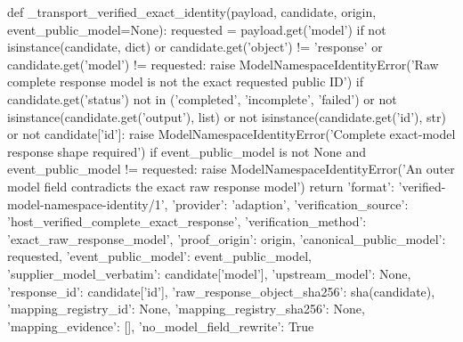 {def _transport_verified_exact_identity(payload, candidate, origin, event_public_model=None):
    requested = payload.get('model')
    if not isinstance(candidate, dict) or candidate.get('object') != 'response' or candidate.get('model') != requested:
        raise ModelNamespaceIdentityError('Raw complete response model is not the exact requested public ID')
    if candidate.get('status') not in ('completed', 'incomplete', 'failed') or not isinstance(candidate.get('output'), list) or not isinstance(candidate.get('id'), str) or not candidate['id']:
        raise ModelNamespaceIdentityError('Complete exact-model response shape required')
    if event_public_model is not None and event_public_model != requested:
        raise ModelNamespaceIdentityError('An outer model field contradicts the exact raw response model')
    return {'format': 'verified-model-namespace-identity/1', 'provider': 'adaption',
        'verification_source': 'host_verified_complete_exact_response',
        'verification_method': 'exact_raw_response_model', 'proof_origin': origin,
        'canonical_public_model': requested, 'event_public_model': event_public_model,
        'supplier_model_verbatim': candidate['model'], 'upstream_model': None,
        'response_id': candidate['id'], 'raw_response_object_sha256': sha(candidate),
        'mapping_registry_id': None, 'mapping_registry_sha256': None, 'mapping_evidence': [],
        'no_model_field_rewrite': True}


}

